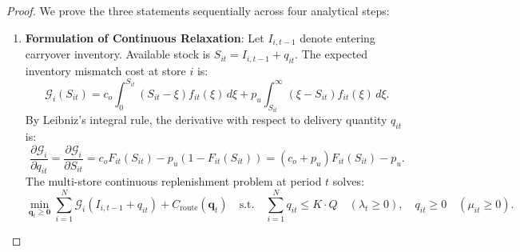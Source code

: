 \documentclass[11pt,a4paper]{article}
\theoremstyle{definition}
\theoremstyle{remark}
\begin{document}
\begin{itemize}[leftmargin=*]
    \begin{proof}
    We prove the three statements sequentially across four analytical steps:
    \begin{enumerate}[label=\textbf{Part \arabic*.},wide=0pt]
        \item \textbf{Formulation of Continuous Relaxation}:
        Let $I_{i,t-1}$ denote entering carryover inventory. Available stock is $S_{it} = I_{i,t-1} + q_{it}$. The expected inventory mismatch cost at store $i$ is:
        \begin{equation*}
            \mathcal{G}_i(S_{it}) = c_o \int_0^{S_{it}} (S_{it} - \xi) f_{it}(\xi) \, d\xi + p_u \int_{S_{it}}^\infty (\xi - S_{it}) f_{it}(\xi) \, d\xi.
        \end{equation*}
        By Leibniz's integral rule, the derivative with respect to delivery quantity $q_{it}$ is:
        \begin{equation*}
            \frac{\partial \mathcal{G}_i}{\partial q_{it}} = \frac{\partial \mathcal{G}_i}{\partial S_{it}} = c_o F_{it}(S_{it}) - p_u (1 - F_{it}(S_{it})) = (c_o + p_u) F_{it}(S_{it}) - p_u.
        \end{equation*}
        The multi-store continuous replenishment problem at period $t$ solves:
        \begin{equation*}
            \min_{\mathbf{q}_t \ge \mathbf{0}} \sum_{i=1}^N \mathcal{G}_i(I_{i,t-1} + q_{it}) + C_{\text{route}}(\mathbf{q}_t) \quad \text{s.t.} \quad \sum_{i=1}^N q_{it} \le K \cdot Q \quad (\lambda_t \ge 0), \quad q_{it} \ge 0 \quad (\mu_{it} \ge 0).
        \end{equation*}


\end{enumerate}
\end{proof}
\end{itemize}
\end{document}
